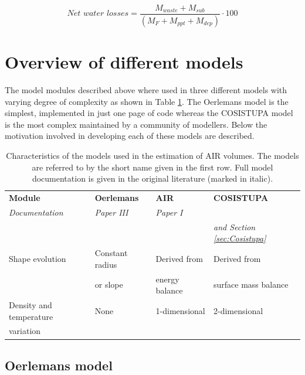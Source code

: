 \begin{equation} \textit{Net water losses} = \frac{M_{waste}+M_{sub}}{(M_F+M_{ppt}+M_{dep})} \cdot 100 \end{equation}

\section{Overview of different models}
\label{sec:MIP}

The model modules described above where used in three different models with varying degree of complexity as
shown in Table \ref{tab:MIP}. The Oerlemans model is the simplest, implemented in just one page of code whereas
the COSISTUPA model is the most complex maintained by a community of modellers. Below the motivation involved
in developing each of these models are described.

\begin{table}[ht]
	\centering
  \caption{Characteristics of the models used in the estimation of AIR volumes. The models are referred to by
  the short name given in the first row. Full model documentation is given in the original literature (marked in
  italic). }      

	\label{tab:MIP}
	\begin{tabular}{|llll|}
		\hline
		\textbf{Module}        & \textbf{Oerlemans} & \textbf{AIR} & \textbf{COSISTUPA}     \\ 
		\textit{Documentation} & \textit{Paper III} & \textit{Paper I} & \textit{\citet{sauterCOSIPYV1Opensource2020}} \\ 
		                       &                    &                  & \textit{and Section \ref{sec:Cosistupa}}     \\ \hline
		Shape evolution        & Constant radius     & Derived from  & Derived from        \\
                           & or slope            & energy balance & surface mass balance        \\\hline
		Density and temperature& None & 1-dimensional   & 2-dimensional   \\
		variation              &           &        & \\ \hline
	\end{tabular}
\end{table}

\subsection{Oerlemans model}

